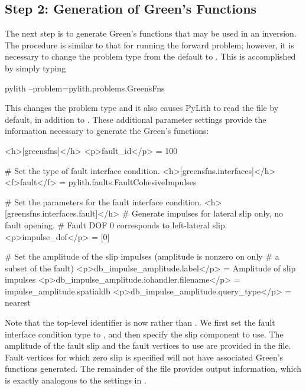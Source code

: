 \subsection{Step 2: Generation of Green's Functions}

The next step is to generate Green's functions that may be used in
an inversion. The procedure is similar to that for running the forward
problem; however, it is necessary to change the problem type from
the default  to . This is
accomplished by simply typing
\begin{shell}
pylith --problem=pylith.problems.GreensFns
\end{shell}
This changes the problem type and it also causes PyLith to read the
file  by default, in addition to .
These additional parameter settings provide the information necessary
to generate the Green's functions:
\begin{cfg}
<h>[greensfns]</h>
<p>fault_id</p> = 100

# Set the type of fault interface condition.
<h>[greensfns.interfaces]</h>
<f>fault</f> = pylith.faults.FaultCohesiveImpulses

# Set the parameters for the fault interface condition.
<h>[greensfns.interfaces.fault]</h>
# Generate impulses for lateral slip only, no fault opening.
# Fault DOF 0 corresponds to left-lateral slip.
<p>impulse_dof</p> = [0]

# Set the amplitude of the slip impulses (amplitude is nonzero on only
# a subset of the fault)
<p>db_impulse_amplitude.label</p> = Amplitude of slip impulses
<p>db_impulse_amplitude.iohandler.filename</p> = impulse_amplitude.spatialdb
<p>db_impulse_amplitude.query_type</p> = nearest
\end{cfg}
Note that the top-level identifier is now  rather
than . We first set the fault interface condition
type to , and then specify the slip
component to use. The amplitude of the fault slip and the fault
vertices to use are provided in the
 file.  Fault vertices for
which zero slip is specified will not have associated Green's
functions generated. The remainder of the 
file provides output information, which is exactly analogous to the
settings in .

